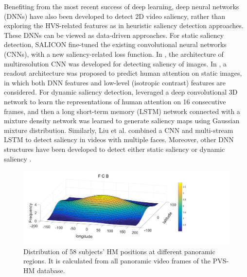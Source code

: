 \documentclass[10pt,journal,compsoc]{IEEEtran}
\begin{document}
Benefiting from the most recent success of deep learning, deep
neural networks (DNNs) \cite{Vig_2014_CVPR, huang2015salicon, kruthiventi2015deepfix, Liu_2015_CVPR, wang2016RCNN, bazzani2016recurrent, Liu2017cvpr, bak2016two,wang2017deep, Kummerer_2017_ICCV, Palazzi_2017_ICCV} have also been developed to detect 2D video saliency, rather than
exploring the HVS-related features as in heuristic saliency detection
approaches. These DNNs can be viewed as data-driven approaches.
For static saliency detection, SALICON \cite{huang2015salicon} fine-tuned the existing
convolutional neural networks (CNNs), with a new saliency-related
loss function. In \cite{Liu_2015_CVPR}, the architecture of multiresolution CNN was developed for detecting saliency of images.
In \cite{Kummerer_2017_ICCV}, a readout architecture was proposed to predict human attention on static images, in which both DNN features and low-level (isotropic contrast) features are considered.
For dynamic saliency detection, \cite{bazzani2016recurrent}  leveraged a
deep convolutional 3D network to learn the representations
of human attention on 16 consecutive frames, and then a long short-term
memory (LSTM) network connected with a mixture density
network was learned to generate saliency maps using Gaussian
mixture distribution. Similarly, Liu et al. \cite{Liu2017cvpr} combined a CNN
and multi-stream LSTM to detect saliency in videos with multiple
faces. Moreover, other DNN structures have been developed to
detect either static saliency \cite{Vig_2014_CVPR, kruthiventi2015deepfix, wang2016RCNN} or dynamic saliency \cite{bak2016two,bazzani2016recurrent,wang2017deep, Palazzi_2017_ICCV}.


\begin{figure}
\vspace{-1em}
	\begin{center}
		\centerline{\includegraphics[width=.9\columnwidth]{figures/database/huoshantu}}%
        \vspace{-.5em}
		\caption{\footnotesize{Distribution of 58 subjects' HM positions at different panoramic regions. It is calculated from all panoramic video frames of the PVS-HM database. }}
		\label{huoshantu}
	\end{center}
\vspace{-2.5em}
\end{figure}
\end{document}
